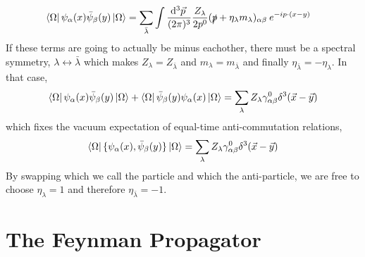 \documentclass[12pt]{article}
\begin{document}
\begin{align*}
\left< \Omega \right| \psi_{\alpha}(x) \bar{\psi}_{\beta}(y) \left| \Omega \right> & = \sum_{\bar{\lambda}} \int \frac{\mathrm{d}^{3} \vec{p} \:}{(2 \pi)^3} \frac{Z_{\lambda}}{2 p^0} (\slashed{p} + \eta_\lambda m_\lambda)_{\alpha \beta} \: e^{- i p \cdot (x - y) }
\end{align*}
If these terms are going to actually be minus eachother, there must be a spectral symmetry, $\lambda \leftrightarrow \bar{\lambda}$  which makes $Z_{\lambda} = Z_{\bar{\lambda}}$ and $m_{\lambda} = m_{\bar{\lambda}}$ and finally $\eta_{\bar{\lambda}} = - \eta_{\lambda}$. In that case,
\[ \left< \Omega \right| \psi_{\alpha}(x) \bar{\psi}_{\beta}(y) \left| \Omega \right> + \left< \Omega \right| \bar{\psi}_{\beta}(y) \psi_{\alpha}(x) \left| \Omega \right> = \sum_{\lambda} Z_{\lambda} \gamma^0_{\alpha \beta} \delta^3(\vec{x} - \vec{y})\]
which fixes the vacuum expectation of equal-time anti-commutation relations,
\[ \left< \Omega \right| \{\psi_{\alpha}(x), \bar{\psi}_{\beta}(y) \} \left| \Omega \right> = \sum_{\lambda} Z_{\lambda} \gamma^0_{\alpha \beta} \delta^3(\vec{x} - \vec{y})\]
By swapping which we call the particle and which the anti-particle, we are free to choose $\eta_{\lambda} = 1$ and therefore $\eta_{\bar{\lambda}} = -1$.

\section{The Feynman Propagator}
\end{document}
